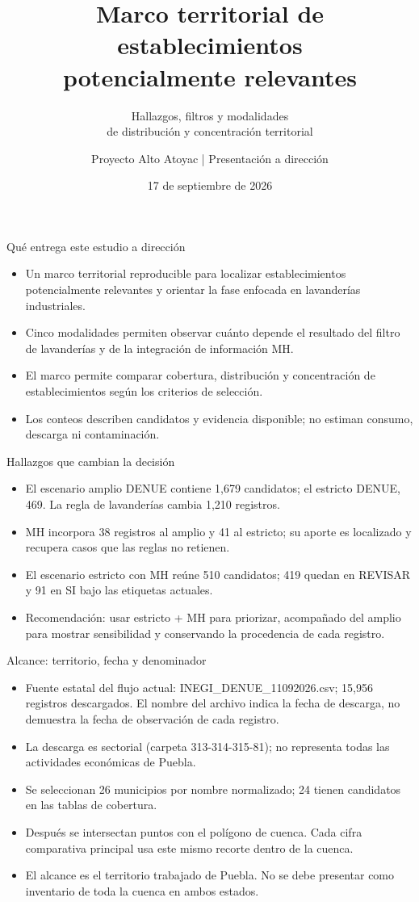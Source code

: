 \documentclass[aspectratio=169,10pt]{beamer}
\title{Marco territorial de establecimientos\\potencialmente relevantes}
\subtitle{Hallazgos, filtros y modalidades\\de distribución y concentración territorial}
\author{Proyecto Alto Atoyac | Presentación a dirección}
\date{17 de septiembre de 2026}
\begin{document}
\begin{frame}\titlepage\end{frame}
\begin{frame}{Qué entrega este estudio a dirección}
\small
\begin{itemize}
\item Un marco territorial reproducible para localizar establecimientos potencialmente relevantes y orientar la fase enfocada en lavanderías industriales.
\item Cinco modalidades permiten observar cuánto depende el resultado del filtro de lavanderías y de la integración de información MH.
\item El marco permite comparar cobertura, distribución y concentración de establecimientos según los criterios de selección.
\item Los conteos describen candidatos y evidencia disponible; no estiman consumo, descarga ni contaminación.
\end{itemize}
\end{frame}
\begin{frame}{Hallazgos que cambian la decisión}
\small
\begin{itemize}
\item El escenario amplio DENUE contiene 1,679 candidatos; el estricto DENUE, 469. La regla de lavanderías cambia 1,210 registros.
\item MH incorpora 38 registros al amplio y 41 al estricto; su aporte es localizado y recupera casos que las reglas no retienen.
\item El escenario estricto con MH reúne 510 candidatos; 419 quedan en REVISAR y 91 en SI bajo las etiquetas actuales.
\item Recomendación: usar estricto + MH para priorizar, acompañado del amplio para mostrar sensibilidad y conservando la procedencia de cada registro.
\end{itemize}
\end{frame}
\begin{frame}{Alcance: territorio, fecha y denominador}
\small
\begin{itemize}
\item Fuente estatal del flujo actual: INEGI\_DENUE\_11092026.csv; 15,956 registros descargados. El nombre del archivo indica la fecha de descarga, no demuestra la fecha de observación de cada registro.
\item La descarga es sectorial (carpeta 313-314-315-81); no representa todas las actividades económicas de Puebla.
\item Se seleccionan 26 municipios por nombre normalizado; 24 tienen candidatos en las tablas de cobertura.
\item Después se intersectan puntos con el polígono de cuenca. Cada cifra comparativa principal usa este mismo recorte dentro de la cuenca.
\item El alcance es el territorio trabajado de Puebla. No se debe presentar como inventario de toda la cuenca en ambos estados.
\end{itemize}
\end{frame}
\end{document}
